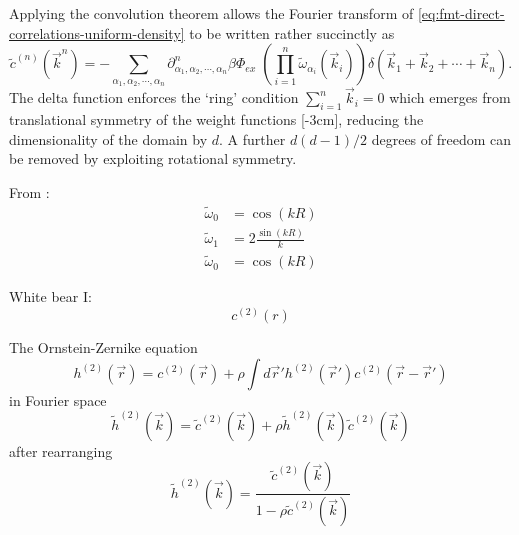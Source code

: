 \documentclass[11pt]{report}
\begin{document}
Applying the convolution theorem allows the Fourier transform of \eqref{eq:fmt-direct-correlations-uniform-density} to be written rather succinctly as
\begin{equation}
  \tilde{c}^{(n)}(\vec{k}^n) =
  - \sum_{\alpha_1, \alpha_2, \cdots, \alpha_n}
  \partial^n_{\alpha_1, \alpha_2, \cdots, \alpha_n} \beta\Phi_{ex} \;
  \left( \prod_{i=1}^n \widetilde{\omega}_{\alpha_i}(\vec{k}_i) \right)
  \delta(\vec{k}_1 + \vec{k}_2 + \cdots + \vec{k}_n).
\end{equation}
The delta function enforces the `ring' condition $\sum_{i=1}^n \vec{k}_i = 0$ which emerges from translational symmetry of the weight functions%
[-3cm],
reducing the dimensionality of the domain by $d$.
A further $d(d-1)/2$ degrees of freedom%
can be removed by exploiting rotational symmetry.

From \cite{Rosenfeld1990}:
\begin{align}
  \widetilde{\omega}_0 &= \cos{(kR)} \\
  \widetilde{\omega}_1 &= 2\frac{\sin{(kR)}}{k} \\
  \widetilde{\omega}_0 &= \cos{(kR)}
\end{align}

White bear I:
\begin{equation}
  c^{(2)}(r)
\end{equation}

The Ornstein-Zernike equation
\begin{equation}
  h^{(2)}(\vec{r}) =
  c^{(2)}(\vec{r}) +
  \rho \int d\vec{r}' h^{(2)}(\vec{r}') c^{(2)}(\vec{r} - \vec{r}')
\end{equation}
in Fourier space
\begin{equation*}
  \tilde{h}^{(2)}(\vec{k}) =
  \tilde{c}^{(2)}(\vec{k}) +
  \rho \tilde{h}^{(2)}(\vec{k}) \tilde{c}^{(2)}(\vec{k})
\end{equation*}
after rearranging
\begin{equation}
  \tilde{h}^{(2)}(\vec{k}) =
  \frac{\tilde{c}^{(2)}(\vec{k})}{1 - \rho \tilde{c}^{(2)}(\vec{k})}
\end{equation}
\end{document}
